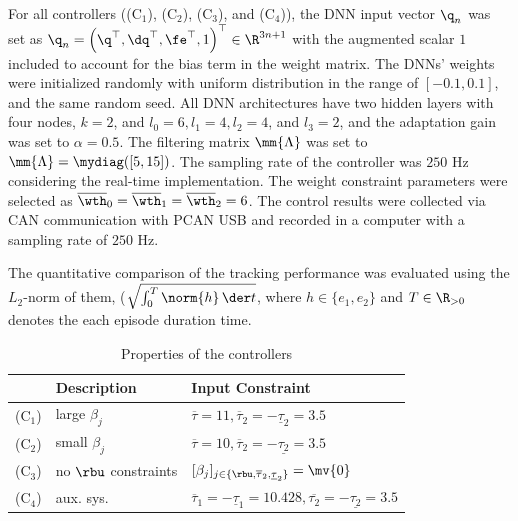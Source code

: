 \documentclass[lettersize,journal]{IEEEtran}
\begin{document}
\hfill

For all controllers ((C$_1$), (C$_2$), (C$_3$), and (C$_4$)), the DNN input vector ${\q}_n$ was set as ${\q}_n=\left(\q^\top,\dq^\top,\fe^\top,1\right)^\top\in\R^{3n+1}$ with the augmented scalar $1$ included to account for the bias term in the weight matrix. 
The DNNs' weights were initialized randomly with uniform distribution in the range of $[-0.1,0.1]$, and the same random seed.
All DNN architectures have two hidden layers with four nodes, \ie $k=2$, and $l_0=6, l_1=4, l_2=4$, and $l_3=2$, and the adaptation gain was set to $\alpha=0.5$.
The filtering matrix $\mm{\Lambda}$ was set to $\mm{\Lambda}=\mydiag([5,15])$.
The sampling rate of the controller was $250$ Hz considering the real-time implementation.
The weight constraint parameters were selected as $\overline\wth_0=\overline\wth_1=\overline\wth_2=6$.
The control results were collected via CAN communication with PCAN USB  and recorded in a computer with a sampling rate of $250$ Hz.

The quantitative comparison of the tracking performance was evaluated using the $L_2$-norm of them, (\ie $\sqrt{\int_0^T\norm{h}\,\der t}$, where $h\in\{e_1,e_2\}$ and $T\in\R_{>0}$ denotes the each episode duration time.

\begin{table}[t]
    \renewcommand{\arraystretch}{1.3}
    \caption{Properties of the controllers}
    \label{table:controller}
    \centering
    \begin{tabular}{c l l}
    \hline
        &\bf{Description}&\bf{Input Constraint}\\
    \hline
    \hline
        (C$_1$)&large $\beta_j$&$\overline{\tau}=11,\overline{\tau}_2=-\underline{\tau}_2=3.5$ \\
    \hline
        (C$_2$)&small $\beta_j$&$\overline{\tau}=10,\overline{\tau}_2=-\underline{\tau_2}=3.5$ \\
    \hline
        (C$_3$)&no $\rbu$ constraints&$[\beta_j]_{j\in\{\rbu,\overline{\tau}_2,\underline{\tau}_2\}}=\mv{0}$ \\
    \hline
        (C$_4$)&aux. sys.&$\overline{\tau}_1=-\underline{\tau}_1=10.428,\overline{\tau_2}=-\underline{\tau_2}=3.5$\\
    \hline
    \end{tabular}
    \label{table:controllers}
\end{table}
\end{document}
